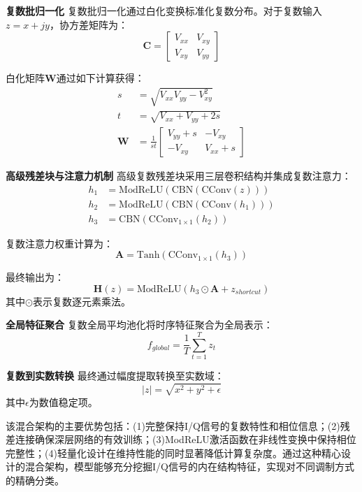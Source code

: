 \documentclass[conference]{IEEEtran}
\begin{document}
\textbf{复数批归一化} 复数批归一化通过白化变换标准化复数分布。对于复数输入$z = x + jy$，协方差矩阵为：
\begin{equation}
\mathbf{C} = \begin{bmatrix} V_{xx} & V_{xy} \\ V_{xy} & V_{yy} \end{bmatrix}
\end{equation}

白化矩阵$\mathbf{W}$通过如下计算获得：
\begin{align}
s &= \sqrt{V_{xx}V_{yy} - V_{xy}^2} \\
t &= \sqrt{V_{xx} + V_{yy} + 2s} \\
\mathbf{W} &= \frac{1}{st}\begin{bmatrix} V_{yy} + s & -V_{xy} \\ -V_{xy} & V_{xx} + s \end{bmatrix}
\end{align}

\textbf{高级残差块与注意力机制} 高级复数残差块采用三层卷积结构并集成复数注意力：
\begin{align}
h_1 &= \text{ModReLU}(\text{CBN}(\text{CConv}(z))) \\
h_2 &= \text{ModReLU}(\text{CBN}(\text{CConv}(h_1))) \\
h_3 &= \text{CBN}(\text{CConv}_{1 \times 1}(h_2))
\end{align}

复数注意力权重计算为：
\begin{equation}
\mathbf{A} = \text{Tanh}(\text{CConv}_{1 \times 1}(h_3))
\end{equation}

最终输出为：
\begin{equation}
\mathbf{H}(z) = \text{ModReLU}(h_3 \odot \mathbf{A} + z_{shortcut})
\end{equation}
其中$\odot$表示复数逐元素乘法。

\textbf{全局特征聚合} 复数全局平均池化将时序特征聚合为全局表示：
\begin{equation}
f_{global} = \frac{1}{T} \sum_{t=1}^T z_t
\end{equation}

\textbf{复数到实数转换} 最终通过幅度提取转换至实数域：
\begin{equation}
|z| = \sqrt{x^2 + y^2 + \epsilon}
\end{equation}
其中$\epsilon$为数值稳定项。



该混合架构的主要优势包括：(1)完整保持I/Q信号的复数特性和相位信息；(2)残差连接确保深层网络的有效训练；(3)ModReLU激活函数在非线性变换中保持相位完整性；(4)轻量化设计在维持性能的同时显著降低计算复杂度。通过这种精心设计的混合架构，模型能够充分挖掘I/Q信号的内在结构特征，实现对不同调制方式的精确分类。
\end{document}
